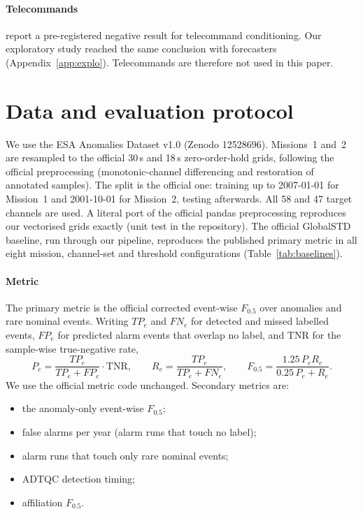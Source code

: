 \documentclass[preprint,12pt,authoryear]{elsarticle}
\begin{document}
\paragraph{Telecommands}
\citet{sahin2026tccad} report a pre-registered negative result for telecommand conditioning.
Our exploratory study reached the same conclusion with forecasters (Appendix~\ref{app:explo}).
Telecommands are therefore not used in this paper.

\section{Data and evaluation protocol}\label{sec:data}
We use the ESA Anomalies Dataset v1.0 (Zenodo 12528696). Missions~1 and~2 are resampled to
the official 30\,s and 18\,s zero-order-hold grids, following the official preprocessing
(monotonic-channel differencing and restoration of annotated samples). The split is the
official one: training up to 2007-01-01 for Mission~1 and 2001-10-01 for Mission~2, testing
afterwards. All 58 and 47 target channels are used. A literal port of the official pandas
preprocessing reproduces our vectorised grids exactly (unit test in the repository). The
official GlobalSTD baseline, run through our pipeline, reproduces the published primary
metric in all eight mission, channel-set and threshold configurations
(Table~\ref{tab:baselines}).

\paragraph{Metric}
The primary metric is the official corrected event-wise $F_{0.5}$ over anomalies and rare
nominal events. Writing $TP_e$ and $FN_e$ for detected and missed labelled events, $FP_e$
for predicted alarm events that overlap no label, and $\mathrm{TNR}$ for the sample-wise
true-negative rate,
\begin{equation}
  P_e = \frac{TP_e}{TP_e+FP_e}\cdot \mathrm{TNR},\qquad R_e=\frac{TP_e}{TP_e+FN_e},\qquad
  F_{0.5}=\frac{1.25\,P_eR_e}{0.25\,P_e+R_e}.
\end{equation}
We use the official metric code unchanged. Secondary metrics are:
\begin{itemize}
\item the anomaly-only event-wise $F_{0.5}$;
\item false alarms per year (alarm runs that touch no label);
\item alarm runs that touch only rare nominal events;
\item ADTQC detection timing;
\item affiliation $F_{0.5}$.
\end{itemize}
\end{document}
